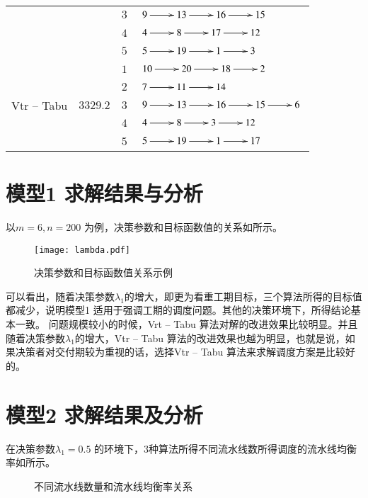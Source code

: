 \begin{table}[h!]
\begin{tabular}{cccl}
          &       & $3$     &  $\xymatrix{9 \ar[r] & 13 \ar[r] & 16 \ar[r] & 15}$\\
          &       & $4$     &  $\xymatrix{4 \ar[r] & 8 \ar[r] & 17 \ar[r] & 12}$\\
          &       & $5$     &  $\xymatrix{5 \ar[r] & 19 \ar[r] & 1 \ar[r] & 3}$\\
       \hline
    \multirow{5}[2]{*}{Vtr -- Tabu} & \multirow{5}[2]{*}{$3329.2$} & $1$     &  $\xymatrix{10 \ar[r] & 20 \ar[r] & 18 \ar[r] & 2}$\\
          &       & $2$     & $\xymatrix{7 \ar[r] & 11 \ar[r] & 14 }$ \\
          &       & $3$     &  $\xymatrix{9 \ar[r] & 13 \ar[r] & 16 \ar[r] & 15\ar[r]&6}$\\
          &       & $4$     &  $\xymatrix{4\ar[r] & 8 \ar[r] & 3 \ar[r] & 12}$\\
          &       & $5$     &  $\xymatrix{5 \ar[r] & 19 \ar[r] & 1 \ar[r] & 17}$\\
    \bottomrule
    \end{tabular}
  \label{tab:resultexample20}
\end{table}
\section{模型1 求解结果与分析}
以$m = 6, n = 200$ 为例，决策参数和目标函数值的关系如所示。
\begin{figure}
\centering
\texttt{[image: lambda.pdf]}
\caption{决策参数和目标函数值关系示例}\label{fig:decisionvsG}
\end{figure}
可以看出，随着决策参数$\lambda_1$的增大，即更为看重工期目标，三个算法所得的目标值都减少，说明模型1 适用于强调工期的调度问题。其他的决策环境下，所得结论基本一致。
问题规模较小的时候，Vrt -- Tabu 算法对解的改进效果比较明显。并且随着决策参数$\lambda_1$的增大，Vtr -- Tabu 算法的改进效果也越为明显，也就是说，如果决策者对交付期较为重视的话，选择Vtr -- Tabu 算法来求解调度方案是比较好的。
\section{模型2 求解结果及分析}
在决策参数$\lambda_1 = 0.5$ 的环境下，$3$种算法所得不同流水线数所得调度的流水线均衡率如所示。
\begin{figure}[h]
\centering
{}
\caption{不同流水线数量和流水线均衡率关系}\label{fig:linenumbervsrate}
\end{figure}

